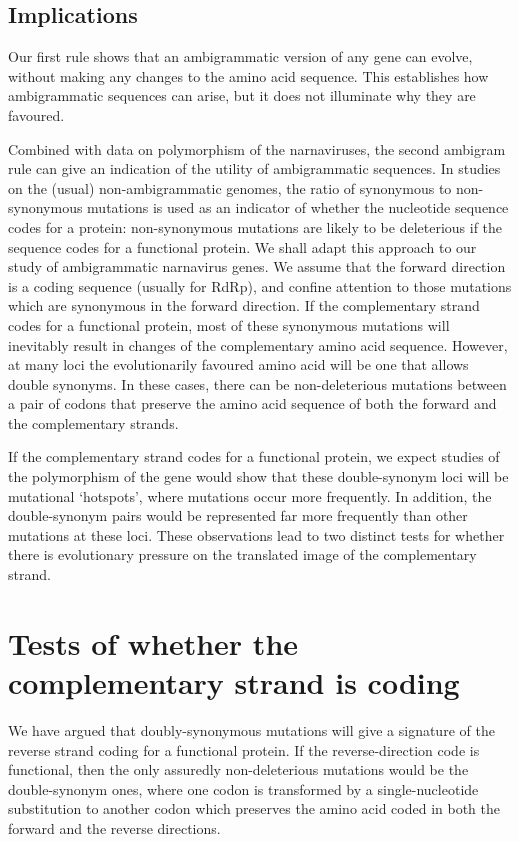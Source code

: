 \documentclass[unnumsec,webpdf,contemporary,large,namedate]{oup-authoring-template}%
\theoremstyle{thmstyleone}%
\theoremstyle{thmstyletwo}%
\theoremstyle{thmstylethree}%
\begin{document}
\subsection{Implications}
\label{sec: 2.3}

Our first rule shows that an ambigrammatic version of any gene can evolve, without 
making any changes to the amino acid sequence. This establishes how ambigrammatic sequences 
can arise, but it does not illuminate why they are favoured. 

Combined with data on polymorphism of the narnaviruses, the second ambigram rule can give an 
indication of the utility of ambigrammatic sequences. In studies on the (usual) non-ambigrammatic 
genomes, the ratio of synonymous to non-synonymous mutations is used as an indicator of 
whether the nucleotide sequence codes for a protein: non-synonymous mutations 
are likely to be deleterious if the sequence codes for a functional protein. 
We shall adapt this approach to our study of ambigrammatic narnavirus genes.
We assume that the forward direction is a coding sequence (usually for RdRp), 
and confine attention to those mutations which are synonymous in the forward 
direction. If the complementary strand codes for a functional protein, most of these 
synonymous mutations will inevitably result in changes of the complementary 
amino acid sequence. However, at many loci the evolutionarily favoured amino acid 
will be one that allows double synonyms. In these cases, there can be 
non-deleterious mutations between a pair of codons that preserve the amino acid 
sequence of both the forward and the 
complementary strands.   

If the complementary strand codes for a functional protein, we expect studies of the 
polymorphism of the gene would show that these double-synonym loci will be 
mutational \lq hotspots', where mutations occur more frequently. In addition, the double-synonym pairs 
would be represented far more frequently than other mutations at these loci. These observations 
lead to two distinct tests for whether there is evolutionary pressure on the translated image of the 
complementary strand.

\section{Tests of whether the complementary strand is coding}
\label{sec: 3}

We have argued that doubly-synonymous mutations will give a signature of the 
reverse strand coding for a functional protein. If the reverse-direction code is functional, 
then the only assuredly non-deleterious mutations would be the double-synonym ones,
where one codon is transformed by a single-nucleotide substitution to another 
codon which preserves the amino acid coded in both the forward and 
the reverse directions. 
\end{document}

